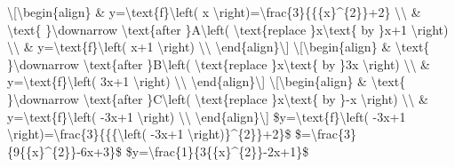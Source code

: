 \item \textbackslash{[}\textbackslash begin\{align\} \& y=\textbackslash text\{f\}\textbackslash left(
x \textbackslash right)=\textbackslash frac\{3\}\{\{\{x\}\textasciicircum\{2\}\}+2\}
\textbackslash\textbackslash{} \& \textbackslash text\{ \}\textbackslash downarrow
\textbackslash text\{after \}A\textbackslash left( \textbackslash text\{replace
\}x\textbackslash text\{ by \}x+1 \textbackslash right) \textbackslash\textbackslash{}
\& y=\textbackslash text\{f\}\textbackslash left( x+1 \textbackslash right)
\textbackslash\textbackslash{} \textbackslash end\{align\}\textbackslash{]}
\textbackslash{[}\textbackslash begin\{align\} \& \textbackslash text\{
\}\textbackslash downarrow \textbackslash text\{after \}B\textbackslash left(
\textbackslash text\{replace \}x\textbackslash text\{ by \}3x \textbackslash right)
\textbackslash\textbackslash{} \& y=\textbackslash text\{f\}\textbackslash left(
3x+1 \textbackslash right) \textbackslash\textbackslash{} \textbackslash end\{align\}\textbackslash{]}
\textbackslash{[}\textbackslash begin\{align\} \& \textbackslash text\{
\}\textbackslash downarrow \textbackslash text\{after \}C\textbackslash left(
\textbackslash text\{replace \}x\textbackslash text\{ by \}-x \textbackslash right)
\textbackslash\textbackslash{} \& y=\textbackslash text\{f\}\textbackslash left(
-3x+1 \textbackslash right) \textbackslash\textbackslash{} \textbackslash end\{align\}\textbackslash{]}
\$y=\textbackslash text\{f\}\textbackslash left( -3x+1 \textbackslash right)=\textbackslash frac\{3\}\{\{\{\textbackslash left(
-3x+1 \textbackslash right)\}\textasciicircum\{2\}\}+2\}\$ \$=\textbackslash frac\{3\}\{9\{\{x\}\textasciicircum\{2\}\}-6x+3\}\$
\$y=\textbackslash frac\{1\}\{3\{\{x\}\textasciicircum\{2\}\}-2x+1\}\$